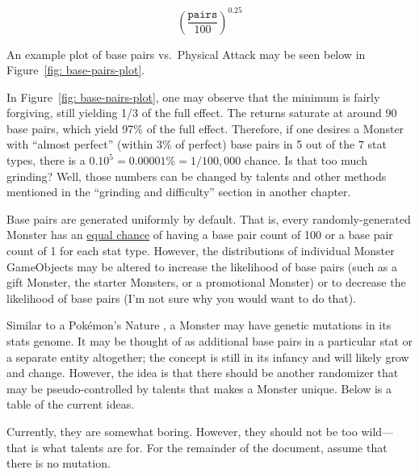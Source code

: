 \begin{equation}\label{eqn: base-pair-contribution}
		\left(\frac{\texttt{pairs}}{100}\right)^{0.25}
\end{equation}


An example plot of base pairs vs.\ Physical Attack may be seen below in Figure~\ref{fig: base-pairs-plot}. 


In Figure~\ref{fig: base-pairs-plot}, one may observe that the minimum is fairly forgiving, still yielding 1/3 of the full effect. The returns saturate at around 90 base pairs, which yield 97\% of the full effect. Therefore, if one desires a Monster with ``almost perfect'' (within 3\% of perfect) base pairs in 5 out of the 7 stat types, there is a $0.10^5 = 0.00001\% = 1/100,000$ chance. Is that too much grinding? Well, those numbers can be changed by talents and other methods mentioned in the ``grinding and difficulty'' section in another chapter.

Base pairs are generated uniformly by default. That is, every randomly-generated Monster has an \ul{equal chance} of having a base pair count of 100 or a base pair count of 1 for each stat type. However, the distributions of individual Monster GameObjects may be altered to increase the likelihood of base pairs (such as a gift Monster, the starter Monsters, or a promotional Monster) or to decrease the likelihood of base pairs (I'm not sure why you would want to do that).




\newpage
{}
Similar to a Pok\'{e}mon's Nature \cite{pkmn-stats}, a Monster may have genetic mutations in its stats genome. It may be thought of as additional base pairs in a particular stat or a separate entity altogether; the concept is still in its infancy and will likely grow and change. However, the idea is that there should be another randomizer that may be pseudo-controlled by talents that makes a Monster unique. Below is a table of the current ideas.


Currently, they are somewhat boring. However, they should not be too wild---that is what talents are for. For the remainder of the document, assume that there is no mutation.





